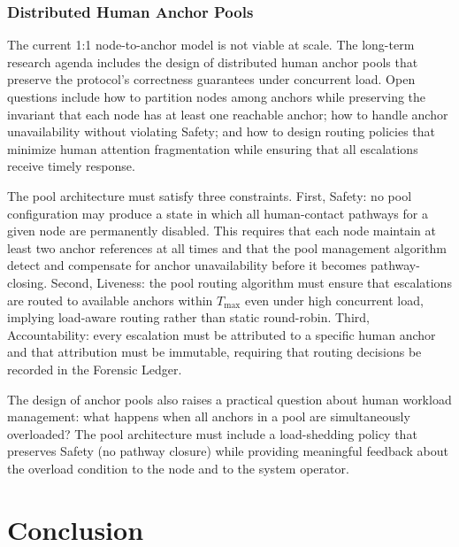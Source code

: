 \subsubsection{Distributed Human Anchor Pools}

The current 1:1 node-to-anchor model is not viable at scale. The long-term research agenda includes the design of distributed human anchor pools that preserve the protocol's correctness guarantees under concurrent load. Open questions include how to partition nodes among anchors while preserving the invariant that each node has at least one reachable anchor; how to handle anchor unavailability without violating Safety; and how to design routing policies that minimize human attention fragmentation while ensuring that all escalations receive timely response.

The pool architecture must satisfy three constraints. First, Safety: no pool configuration may produce a state in which all human-contact pathways for a given node are permanently disabled. This requires that each node maintain at least two anchor references at all times and that the pool management algorithm detect and compensate for anchor unavailability before it becomes pathway-closing. Second, Liveness: the pool routing algorithm must ensure that escalations are routed to available anchors within $T_{\max}$ even under high concurrent load, implying load-aware routing rather than static round-robin. Third, Accountability: every escalation must be attributed to a specific human anchor and that attribution must be immutable, requiring that routing decisions be recorded in the Forensic Ledger.

The design of anchor pools also raises a practical question about human workload management: what happens when all anchors in a pool are simultaneously overloaded? The pool architecture must include a load-shedding policy that preserves Safety (no pathway closure) while providing meaningful feedback about the overload condition to the node and to the system operator.

\section{Conclusion}

